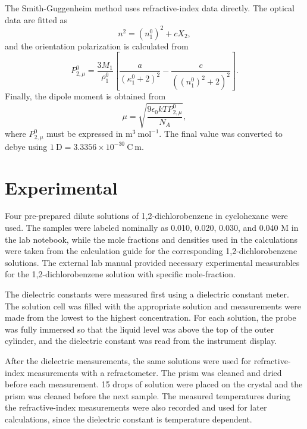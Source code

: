 \documentclass[11pt]{article}
\begin{document}
The Smith-Guggenheim method uses refractive-index data directly. The optical data are fitted as
\begin{equation}
n^2=(n_1^0)^2+cX_2,
\label{eq:nfit}
\end{equation}
and the orientation polarization is calculated from
\begin{equation}
P_{2,\mu}^0=
\frac{3M_1}{\rho_1^0}
\left[
\frac{a}{(\kappa_1^0+2)^2}
-
\frac{c}{((n_1^0)^2+2)^2}
\right].
\label{eq:smith}
\end{equation}
Finally, the dipole moment is obtained from
\begin{equation}
\mu=\sqrt{\frac{9\epsilon_0 kT P_{2,\mu}^0}{N_A}},
\label{eq:dipole}
\end{equation}
where $P_{2,\mu}^0$ must be expressed in $\mathrm{m^3\ mol^{-1}}$. The final value was converted to debye using $1\ \mathrm{D}=3.3356\times10^{-30}\ \mathrm{C\ m}$.

\section*{Experimental}

Four pre-prepared dilute solutions of 1,2-dichlorobenzene in cyclohexane were used. The samples were labeled nominally as 0.010, 0.020, 0.030, and 0.040 M in the lab notebook, while the mole fractions and densities used in the calculations were taken from the calculation guide for the corresponding 1,2-dichlorobenzene solutions. The external lab manual provided necessary experimental measurables for the 1,2-dichlorobenzene solution with specific mole-fraction.\cite{lab_manual}

The dielectric constants were measured first using a dielectric constant meter. The solution cell was filled with the appropriate solution and measurements were made from the lowest to the highest concentration. For each solution, the probe was fully immersed so that the liquid level was above the top of the outer cylinder, and the dielectric constant was read from the instrument display. \cite{lab_manual}

After the dielectric measurements, the same solutions were used for refractive-index measurements with a refractometer. The prism was cleaned and dried before each measurement. 15 drops of solution were placed on the crystal and the prism was cleaned before the next sample. The measured temperatures during the refractive-index measurements were also recorded and used for later calculations, since the dielectric constant is temperature dependent.\cite{lab_manual}
\end{document}

